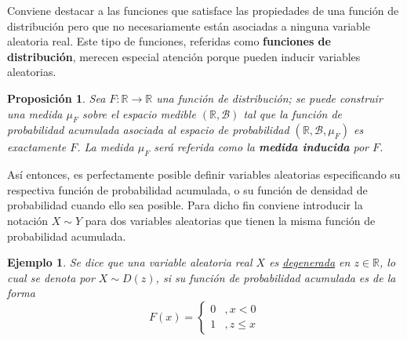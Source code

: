 \documentclass[12pt,letterpaper]{book}
\newtheorem{proposicion}[teorema]{Proposición}
\newtheorem{ejemplo}{Ejemplo}[chapter]
\newcommand{\R}{\mathbb{R}}
\begin{document}
Conviene destacar a las funciones que satisface las propiedades de una función de distribución pero que no necesariamente están asociadas a ninguna variable aleatoria real.
%
Este tipo de funciones, referidas como \textbf{funciones de distribución}, merecen especial atención porque pueden inducir variables aleatorias.

\begin{proposicion}
Sea $F:\R \rightarrow \R$ una función de distribución; se puede construir una medida $\mu_F$ sobre el espacio medible $(\R, \mathcal{B})$ tal que la función de probabilidad acumulada asociada al espacio de probabilidad $(\R, \mathcal{B}, \mu_F)$ es exactamente $F$.
%
La medida $\mu_F$ será referida como la \textbf{medida inducida} por $F$.
\end{proposicion}

Así entonces, es perfectamente posible definir variables aleatorias especificando su respectiva función de probabilidad acumulada, o su función de densidad de probabilidad cuando ello sea posible.
%
Para dicho fin conviene introducir la notación $X \sim Y$ para dos variables aleatorias que tienen la misma función de probabilidad acumulada.


\begin{ejemplo}
Se dice que una variable aleatoria real $X$ es \ul{degenerada} en $z\in \R$, lo cual se denota por $X\sim D(z)$, si su función de probabilidad acumulada es de la forma
\begin{equation}
F(x) = \begin{cases}
0 &, x < 0 \\
1 &, z \leq x
\end{cases}
\end{equation}
\end{ejemplo}
\end{document}
